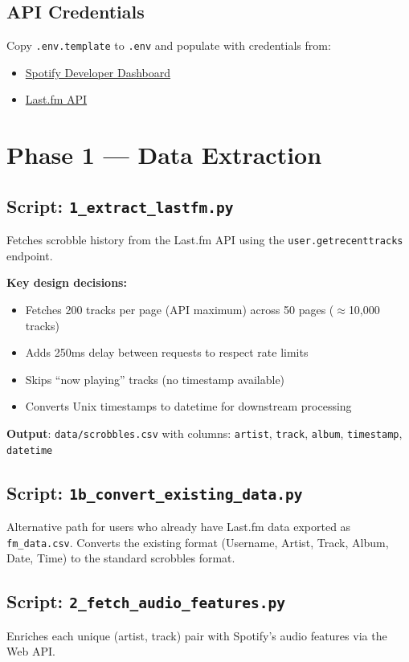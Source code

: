 \documentclass[12pt, a4paper]{article}
\begin{document}
\subsection{API Credentials}
Copy \texttt{.env.template} to \texttt{.env} and populate with credentials from:
\begin{itemize}
    \item \href{https://developer.spotify.com/dashboard}{Spotify Developer Dashboard}
    \item \href{https://www.last.fm/api/account/create}{Last.fm API}
\end{itemize}

\section{Phase 1 — Data Extraction}

\subsection{Script: \texttt{1\_extract\_lastfm.py}}
Fetches scrobble history from the Last.fm API using the \texttt{user.getrecenttracks} endpoint.

\textbf{Key design decisions:}
\begin{itemize}
    \item Fetches 200 tracks per page (API maximum) across 50 pages ($\approx$10,000 tracks)
    \item Adds 250ms delay between requests to respect rate limits
    \item Skips ``now playing'' tracks (no timestamp available)
    \item Converts Unix timestamps to datetime for downstream processing
\end{itemize}

\textbf{Output}: \texttt{data/scrobbles.csv} with columns: \texttt{artist}, \texttt{track}, \texttt{album}, \texttt{timestamp}, \texttt{datetime}

\subsection{Script: \texttt{1b\_convert\_existing\_data.py}}
Alternative path for users who already have Last.fm data exported as \texttt{fm\_data.csv}. Converts the existing format (Username, Artist, Track, Album, Date, Time) to the standard scrobbles format.

\subsection{Script: \texttt{2\_fetch\_audio\_features.py}}
Enriches each unique (artist, track) pair with Spotify's audio features via the Web API.
\end{document}
